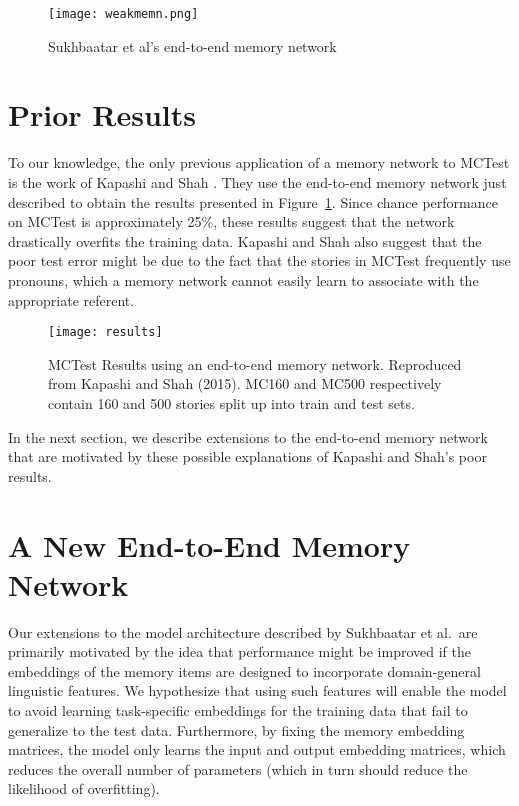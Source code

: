 \documentclass[10pt]{article}
\begin{document}
\begin{figure}
\centering
	\texttt{[image: weakmemn.png]}
	\caption{Sukhbaatar et al's end-to-end memory network}
\end{figure}

\section{Prior Results}
To our knowledge, the only previous application of a memory network to MCTest is 
the work of Kapashi and Shah \cite{Darshan:2015}. They use the end-to-end memory 
network just described to obtain the results presented in 
Figure~\ref{fig:prior}.  Since chance performance on MCTest is approximately 
25\%, these results suggest that the network drastically overfits the training 
data. Kapashi and Shah also suggest that the poor test error might be due to the 
fact that the stories in MCTest frequently use pronouns, which a memory network 
cannot easily learn to associate with the appropriate referent. 

\begin{figure}[h]
\centering
	\texttt{[image: results]}
	\caption{MCTest Results using an end-to-end memory network. Reproduced from 
        Kapashi and Shah (2015). MC160 and MC500 respectively contain 160 and 
        500 stories split up into train and test sets.}\label{fig:prior}
\end{figure}

 In the next section, we describe extensions to the end-to-end memory network that are motivated by these possible explanations of Kapashi and Shah's poor results. 


\section{A New End-to-End Memory Network}

Our extensions to the model architecture described by Sukhbaatar et al.\ are 
primarily motivated by the idea that performance might be improved if the 
embeddings of the memory items are designed to incorporate domain-general 
linguistic features. We hypothesize that using such features will enable the 
model to avoid learning task-specific embeddings for the training data that fail 
to generalize to the test data. Furthermore, by fixing the memory embedding 
matrices, the model only learns the input and output embedding matrices, which 
reduces the overall number of parameters (which in turn should reduce the 
likelihood of overfitting).
\end{document}
